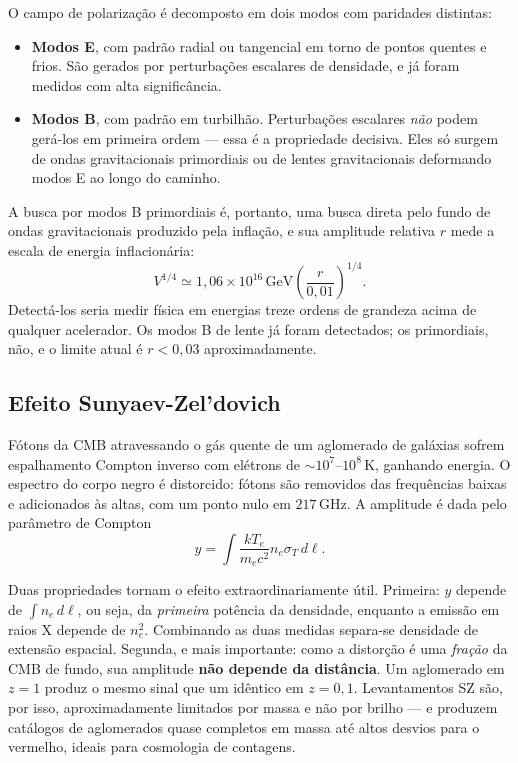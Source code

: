 \documentclass[11pt,a4paper]{article}
\begin{document}
O campo de polarização é decomposto em dois modos com paridades distintas:
\begin{itemize}
\item \textbf{Modos E}, com padrão radial ou tangencial em torno de pontos quentes e frios. São gerados por perturbações escalares de densidade, e já foram medidos com alta significância.
\item \textbf{Modos B}, com padrão em turbilhão. Perturbações escalares \emph{não} podem gerá-los em primeira ordem --- essa é a propriedade decisiva. Eles só surgem de ondas gravitacionais primordiais ou de lentes gravitacionais deformando modos E ao longo do caminho.
\end{itemize}
A busca por modos B primordiais é, portanto, uma busca direta pelo fundo de ondas gravitacionais produzido pela inflação, e sua amplitude relativa $r$ mede a escala de energia inflacionária:
\[
V^{1/4}\simeq1{,}06\times10^{16}\,\mathrm{GeV}\left(\frac{r}{0{,}01}\right)^{1/4}.
\]
Detectá-los seria medir física em energias treze ordens de grandeza acima de qualquer acelerador. Os modos B de lente já foram detectados; os primordiais, não, e o limite atual é $r<0{,}03$ aproximadamente.

\subsection*{Efeito Sunyaev-Zel'dovich}

Fótons da CMB atravessando o gás quente de um aglomerado de galáxias sofrem espalhamento Compton inverso com elétrons de $\sim10^{7}$--$10^{8}\,\mathrm{K}$, ganhando energia. O espectro do corpo negro é distorcido: fótons são removidos das frequências baixas e adicionados às altas, com um ponto nulo em $217\,\mathrm{GHz}$. A amplitude é dada pelo parâmetro de Compton
\[
y=\int\frac{k T_e}{m_ec^{2}}n_e\sigma_T\,d\ell.
\]

Duas propriedades tornam o efeito extraordinariamente útil. Primeira: $y$ depende de $\int n_e\,d\ell$, ou seja, da \emph{primeira} potência da densidade, enquanto a emissão em raios X depende de $n_e^{2}$. Combinando as duas medidas separa-se densidade de extensão espacial. Segunda, e mais importante: como a distorção é uma \emph{fração} da CMB de fundo, sua amplitude \textbf{não depende da distância}. Um aglomerado em $z=1$ produz o mesmo sinal que um idêntico em $z=0{,}1$. Levantamentos SZ são, por isso, aproximadamente limitados por massa e não por brilho --- e produzem catálogos de aglomerados quase completos em massa até altos desvios para o vermelho, ideais para cosmologia de contagens.
\end{document}

